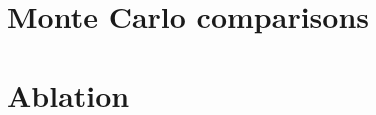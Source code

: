 \documentclass[11pt]{article}
\begin{document}
\section{Monte Carlo comparisons}

\clearpage
\section{Ablation}

\clearpage


\end{document}
